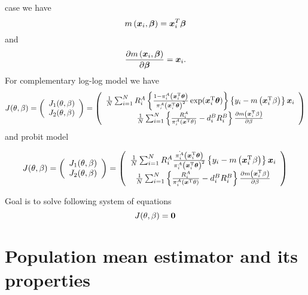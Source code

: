 \documentclass[
  letterpaper,
  DIV=11,
  numbers=noendperiod]{scrreprt}
\begin{document}
case we have \[
m\left(\boldsymbol{x}_i, \boldsymbol{\beta}\right) = \boldsymbol{x}_i^{T} \boldsymbol{\beta}
\] and \[
\frac{\partial m\left(\boldsymbol{x}_i, \boldsymbol{\beta}\right)}{\partial \boldsymbol{\beta}} = \boldsymbol{x}_i.
\] For complementary log-log model we have \[
\begin{equation}
J(\theta, \beta)=\left(\begin{array}{c}
J_1(\theta, \beta) \\
J_2(\theta, \beta)
\end{array}\right)=\left(\begin{array}{c}
\frac{1}{N} \sum_{i=1}^N R_i^A\left\{\frac{1 - \pi_i^A\left(\bx_i^{\mathrm{T}} \btheta \right)}{\pi_i^A\left(\bx_i^{\mathrm{T}} \btheta \right)^2} \exp(\bx_i^{\mathrm{T}} \btheta)\right\}\left\{y_i-m\left(\bx_i^{\mathrm{T}} \beta\right)\right\} \bx_i \\
\frac{1}{N} \sum_{i=1}^N\left\{\frac{R_i^A}{\pi_i^A\left(\bx^{\mathrm{T}}\theta\right)}-d_i^B R_i^B\right\} \frac{\partial m\left(\bx_i^{\mathrm{T}} \beta\right)}{\partial \beta}
\end{array}\right)
\end{equation}
\] and probit model

\[
\begin{equation}
J(\theta, \beta)=\left(\begin{array}{c}
J_1(\theta, \beta) \\
J_2(\theta, \beta)
\end{array}\right)=\left(\begin{array}{c}
\frac{1}{N} \sum_{i=1}^N R_i^A\frac{\dot{\pi_i^A}\left(\bx_i^{\mathrm{T}} \btheta \right)}{\pi_i^A\left(\bx_i^{\mathrm{T}} \btheta \right)^2} \left\{y_i-m\left(\bx_i^{\mathrm{T}} \beta\right)\right\} \bx_i \\
\frac{1}{N} \sum_{i=1}^N\left\{\frac{R_i^A}{\pi_i^A\left(\bx^{\mathrm{T}}\theta\right)}-d_i^B R_i^B\right\} \frac{\partial m\left(\bx_i^{\mathrm{T}} \beta\right)}{\partial \beta}
\end{array}\right)
\end{equation}
\]

Goal is to solve following system of equations \[
J(\theta, \beta)=\boldsymbol{0}
\]

\section{Population mean estimator and its
properties}\label{population-mean-estimator-and-its-properties-1}
\end{document}
